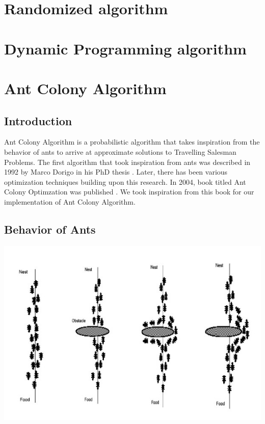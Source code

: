 \documentclass[11pt, english]{article}
\begin{document}
\section{Randomized algorithm}	
	
 \section{Dynamic Programming algorithm}	
	

\newpage
\section{Ant Colony Algorithm}

\subsection{Introduction}

Ant Colony Algorithm is a probabilistic algorithm that takes inspiration from the behavior of ants to arrive at approximate solutions to Travelling Salesman Problems. The first algorithm that took inspiration from ants was described in 1992 by Marco Dorigo in his PhD thesis \cite{Dorigothesis}. Later, there has been various optimization techniques building upon this research. In 2004, book titled Ant Colony Optimzation was published \cite{dorigo_2004}. We took inspiration from this book for our implementation of Ant Colony Algorithm. 

\subsection{Behavior of Ants}

\begin{center}
\includegraphics[scale=0.5]{antfood.jpg}
\end{center}
\end{document}
